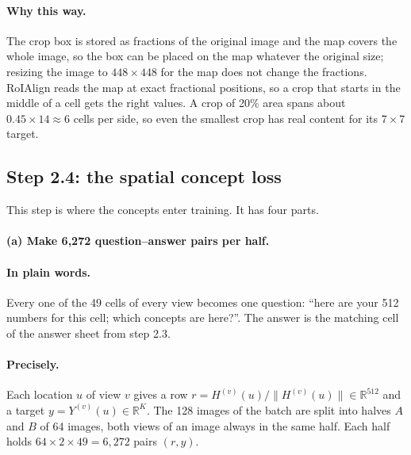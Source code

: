 \documentclass[11pt]{article}
\newcommand{\plain}{\paragraph{In plain words.}}
\newcommand{\precise}{\paragraph{Precisely.}}
\newcommand{\why}{\paragraph{Why this way.}}
\begin{document}
\why The crop box is stored as fractions of the original image and the map covers the whole image, so the box can be
placed on the map whatever the original size; resizing the image to $448\times448$ for the map does not change the
fractions. RoIAlign reads the map at exact fractional positions, so a crop that starts in the middle of a cell gets the
right values. A crop of 20\% area spans about $0.45\times14\approx6$ cells per side, so even the smallest crop has
real content for its $7\times7$ target.

\subsection{Step 2.4: the spatial concept loss}
This step is where the concepts enter training. It has four parts.

\paragraph{(a) Make 6,272 question--answer pairs per half.}
\plain Every one of the 49 cells of every view becomes one question: ``here are your 512 numbers for this cell;
which concepts are here?''. The answer is the matching cell of the answer sheet from step 2.3.

\precise Each location $u$ of view $v$ gives a row $r=H^{(v)}(u)/\lVert H^{(v)}(u)\rVert\in\mathbb R^{512}$ and a target
$y=Y^{(v)}(u)\in\mathbb R^{K}$. The 128 images of the batch are split into halves $A$ and $B$ of 64 images, both
views of an image always in the same half. Each half holds $64\times2\times49=6{,}272$ pairs $(r,y)$.
\end{document}
